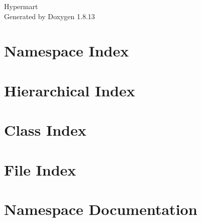 \documentclass[twoside]{book}
\newcommand{\+}{\discretionary{\mbox{\scriptsize$\hookleftarrow$}}{}{}}
\newcommand{\clearemptydoublepage}{%
  \newpage{\pagestyle{empty}\cleardoublepage}%
}
\begin{document}
\begin{titlepage}
\vspace*{7cm}
\begin{center}%
{\Large Hypermart }\\
\vspace*{1cm}
{\large Generated by Doxygen 1.8.13}\\
\end{center}
\end{titlepage}
\clearemptydoublepage
{}
\tableofcontents
\clearemptydoublepage
{}

\chapter{Namespace Index}

\chapter{Hierarchical Index}

\chapter{Class Index}

\chapter{File Index}

\chapter{Namespace Documentation}





















\end{document}

